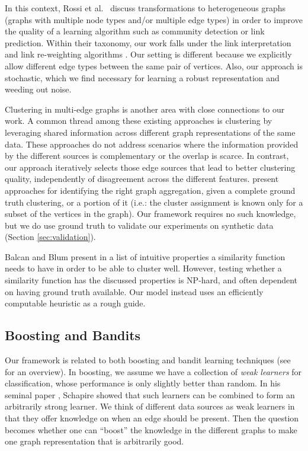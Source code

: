 \documentclass[twoside,twocolumn]{article}
\begin{document}
In this context, Rossi et al.~\cite{Rossi2012} discuss transformations to
heterogeneous graphs (graphs with multiple node types and/or multiple edge
types) in order to improve the quality of a learning algorithm such as
community detection or link prediction. Within their taxonomy, our work falls
under the link interpretation and link re-weighting algorithms
\cite{Xiang2010,Gilbert2009}. Our setting is different because we explicitly
allow different edge types between the same pair of vertices. Also, our
approach is stochastic, which we find necessary for learning a robust
representation and weeding out noise. 

Clustering in multi-edge graphs
\cite{Papalexakis2013,Tang2009,Tang2012,Mucha2010,Berlingerio2011} is another
area with close connections to our work.  A common thread among these existing
approaches is clustering by leveraging shared information across different
graph representations of the same data.  These approaches do not address
scenarios where the information provided by the different sources is
complementary or the overlap is scarce.  In contrast, our approach iteratively
selects those edge sources that lead to better clustering quality,
independently of disagreement across the different features.
\cite{Rocklin2013,Cai2005} present approaches for identifying the right graph
aggregation, given a complete ground truth clustering, or a portion of it
(i.e.: the cluster assignment is known only for a subset of the vertices in the
graph). Our framework requires no such knowledge, but we do use ground truth to
validate our experiments on synthetic data (Section \ref{sec:validation}). 

Balcan and Blum present in \cite{Balcan2006,Balcan2008} a list of intuitive
properties a similarity function needs to have in order to be able to cluster
well. However, testing whether a similarity function has the discussed
properties is NP-hard, and often dependent on having ground truth available.
Our model instead uses an efficiently computable heuristic as a rough guide.

\subsection{Boosting and Bandits}
Our framework is related to both boosting \cite{Schapire90} and bandit learning
techniques (see \cite{Bubeck12} for an overview). In boosting, we assume we
have a collection of {\em weak learners} for classification, whose performance
is only slightly better than random. In his seminal paper \cite{Schapire90},
Schapire showed that such learners can be combined to form an arbitrarily
strong learner. We think of different data sources as weak learners in that
they offer knowledge on when an edge should be present. Then the question
becomes whether one can ``boost'' the knowledge in the different graphs
to make one graph representation that is arbitrarily good.
\end{document}
